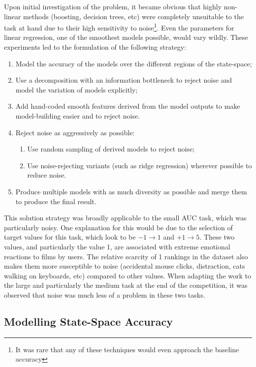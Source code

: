 \documentclass{article}
\begin{document}
Upon initial investigation of the problem, it became obvious that highly non-linear methods (boosting, decision trees, etc) were completely unsuitable to the task at hand due to their high sensitivity to noise\footnote{It was rare that any of these techniques would even approach the baseline accuracy}.  Even the parameters for linear regression, one of the smoothest models possible, would vary wildly.  These experiments led to the formulation of the following strategy:

\begin{enumerate}
\item Model the accuracy of the models over the different regions of the state-space;
\item Use a decomposition with an information bottleneck to reject noise and model the variation of models explicitly;
\item Add hand-coded smooth features derived from the model outputs to make model-building easier and to reject noise.
\item Reject noise as aggressively as possible:
  \begin{enumerate}
  \item Use random sampling of derived models to reject noise;
  \item Use noise-rejecting variants (such as ridge regression) wherever possible to reduce noise.
    \end{enumerate}
\item Produce multiple models with as much diversity as possible and merge them to produce the final result.
\end{enumerate}

This solution strategy was broadly applicable to the small AUC task, which was particularly noisy.
One explanation for this would be due to the selection of target values for this task, which look to be $-1 \rightarrow 1$ and $+1 \rightarrow 5$.  
These two values, and particularly the value 1, are associated with extreme emotional reactions to films by users.  
The relative scarcity of 1 rankings in the dataset also makes them more susceptible to noise (accidental mouse clicks, distraction, cats walking on keyboards, etc) compared to other values.
When adapting the work to the large and particularly the medium task at the end of the competition, it was observed that noise was much less of a problem in these two tasks.

\subsection{Modelling State-Space Accuracy}
\end{document}

